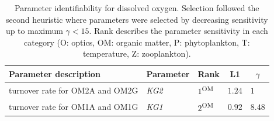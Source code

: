 \documentclass[letterpaper,12pt,oneside]{article}\usepackage[]{graphicx}\usepackage[]{color}
\begin{document}
\begin{table}[!tbp]
{\normalsize
\caption{Parameter identifiability for dissolved oxygen.  Selection followed the second heuristic where parameters were selected by decreasing sensitivity up to maximum $\gamma < 15$.  Rank describes the parameter sensitivity in each category (O: optics, OM: organic matter, P: phytoplankton, T: temperature, Z: zooplankton).\label{tab:identall1}} 
\begin{center}
\begin{tabular}{lllll}
\hline\hline
\multicolumn{1}{l}{Parameter description}&\multicolumn{1}{c}{Parameter}&\multicolumn{1}{c}{Rank}&\multicolumn{1}{c}{L1}&\multicolumn{1}{c}{$\gamma$}\tabularnewline
\hline
\footnotesize{turnover rate for OM2A and OM2G}&\footnotesize{\textit{KG2}}&$1$\textsuperscript{OM}&$1.24$&$1$\tabularnewline
\footnotesize{turnover rate for OM1A and OM1G}&\footnotesize{\textit{KG1}}&$2$\textsuperscript{OM}&$0.92$&$8.48$\tabularnewline
\hline
\end{tabular}\end{center}}

\end{table}
\end{document}
